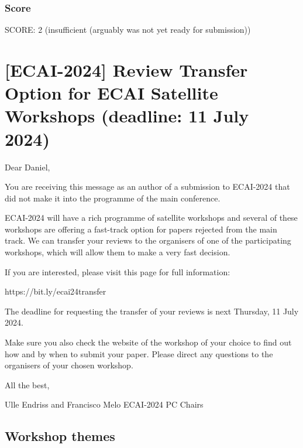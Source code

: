 \subsubsection*{Score}
SCORE: 2 (insufficient (arguably was not yet ready for submission))

\section{[ECAI-2024] Review Transfer Option for ECAI Satellite Workshops (deadline:  11 July 2024)}

Dear Daniel,

You are receiving this message as an author of a submission to ECAI-2024 that did not make it into the programme of the main conference.

ECAI-2024 will have a rich programme of satellite workshops and several of these workshops are offering a fast-track option for papers rejected from the main track. We can transfer your reviews to the organisers of one of the participating workshops, which will allow them to make a very fast decision.

If you are interested, please visit this page for full information:

https://bit.ly/ecai24transfer

The deadline for requesting the transfer of your reviews is next Thursday, 11 July 2024.

Make sure you also check the website of the workshop of your choice to find out how and by when to submit your paper. Please direct any questions to the organisers of your chosen workshop.

All the best,

Ulle Endriss and Francisco Melo
ECAI-2024 PC Chairs

\subsection{Workshop themes}

